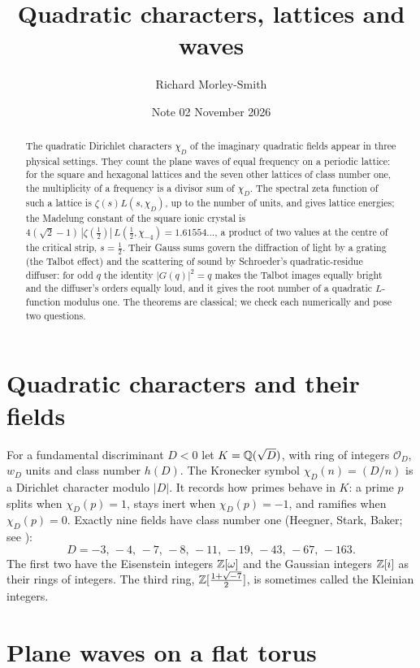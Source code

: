 \documentclass[11pt]{article}
\title{Quadratic characters, lattices and waves}
\author{Richard Morley-Smith}
\date{Note 02 \quad November 2026}
\begin{document}
\maketitle

\begin{abstract}
\noindent
The quadratic Dirichlet characters $\chi_D$ of the imaginary quadratic fields appear in three physical settings.
They count the plane waves of equal frequency on a periodic lattice: for the square and hexagonal lattices and the seven other lattices of class number one, the multiplicity of a frequency is a divisor sum of $\chi_D$.
The spectral zeta function of such a lattice is $\zeta(s)L(s,\chi_D)$, up to the number of units, and gives lattice energies; the Madelung constant of the square ionic crystal is $4(\sqrt2-1)\,|\zeta(\tfrac12)|\,L(\tfrac12,\chi_{-4}) = 1.61554\ldots$, a product of two values at the centre of the critical strip, $s=\tfrac12$.
Their Gauss sums govern the diffraction of light by a grating (the Talbot effect) and the scattering of sound by Schroeder's quadratic-residue diffuser: for odd $q$ the identity $|G(q)|^2 = q$ makes the Talbot images equally bright and the diffuser's orders equally loud, and it gives the root number of a quadratic $L$-function modulus one.
The theorems are classical; we check each numerically and pose two questions.
\end{abstract}

\section{Quadratic characters and their fields}

For a fundamental discriminant $D<0$ let $K = \mathbb{Q}(\sqrt D)$, with ring of integers $\mathcal O_D$, $w_D$ units and class number $h(D)$.
The Kronecker symbol $\chi_D(n) = (D/n)$ is a Dirichlet character modulo $|D|$.
It records how primes behave in $K$: a prime $p$ splits when $\chi_D(p) = 1$, stays inert when $\chi_D(p) = -1$, and ramifies when $\chi_D(p) = 0$.
Exactly nine fields have class number one (Heegner, Stark, Baker; see \cite{Cox}):
\[
  D = -3,\,-4,\,-7,\,-8,\,-11,\,-19,\,-43,\,-67,\,-163.
\]
The first two have the Eisenstein integers $\mathbb{Z}[\omega]$ and the Gaussian integers $\mathbb{Z}[i]$ as their rings of integers.
The third ring, $\mathbb{Z}[\tfrac{1+\sqrt{-7}}2]$, is sometimes called the Kleinian integers.

\section{Plane waves on a flat torus}
\end{document}
